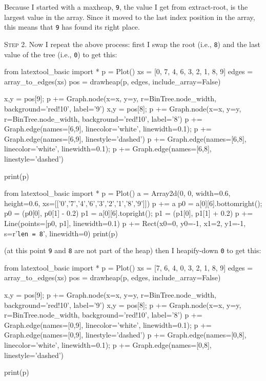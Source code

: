 Because I started with a maxheap, \verb!9!, the value I get from extract-root,
is the largest value in the array.
Since it moved to the last index position in the array,
this means that \verb!9! has found its right place.


\textsc{Step 2}.
Now I repeat the above process:
first I swap the root (i.e., \texttt{8}) and
the last value of the tree (i.e., \texttt{0}) to get this:


\begin{python}
from latextool_basic import *
p = Plot()
xs = [0, 7, 4, 6, 3, 2, 1, 8, 9]
edges = array_to_edges(xs)
pos = drawheap(p, edges, include_array=False)

x,y = pos[9]; p += Graph.node(x=x, y=y, r=BinTree.node_width, background='red!10', label='9')
x,y = pos[8]; p += Graph.node(x=x, y=y, r=BinTree.node_width, background='red!10', label='8')
p += Graph.edge(names=[6,9], linecolor='white', linewidth=0.1); p += Graph.edge(names=[6,9], linestyle='dashed')
p += Graph.edge(names=[6,8], linecolor='white', linewidth=0.1); p += Graph.edge(names=[6,8], linestyle='dashed')

print(p)
\end{python}
\begin{python}
from latextool_basic import *
p = Plot()
a = Array2d(0, 0, width=0.6, height=0.6, 
             xs=[['0','7','4','6','3','2','1','8','9']])
p += a
p0 = a[0][6].bottomright(); p0 = (p0[0], p0[1] - 0.2)
p1 = a[0][6].topright(); p1 = (p1[0], p1[1] + 0.2)
p += Line(points=[p0, p1], linewidth=0.1)
p += Rect(x0=0, y0=-1, x1=2, y1=-1, s=r'\texttt{len = 8}', linewidth=0) 
print(p)
\end{python}

(at this point \verb!9! and \verb!8! are not part of the heap)
then I heapify-down \texttt{0} to get this:

\begin{python}
from latextool_basic import *
p = Plot()
xs = [7, 6, 4, 0, 3, 2, 1, 8, 9]
edges = array_to_edges(xs)
pos = drawheap(p, edges, include_array=False)

x,y = pos[9]; p += Graph.node(x=x, y=y, r=BinTree.node_width, background='red!10', label='9')
x,y = pos[8]; p += Graph.node(x=x, y=y, r=BinTree.node_width, background='red!10', label='8')
p += Graph.edge(names=[0,9], linecolor='white', linewidth=0.1); p += Graph.edge(names=[0,9], linestyle='dashed')
p += Graph.edge(names=[0,8], linecolor='white', linewidth=0.1); p += Graph.edge(names=[0,8], linestyle='dashed')

print(p)
\end{python}

